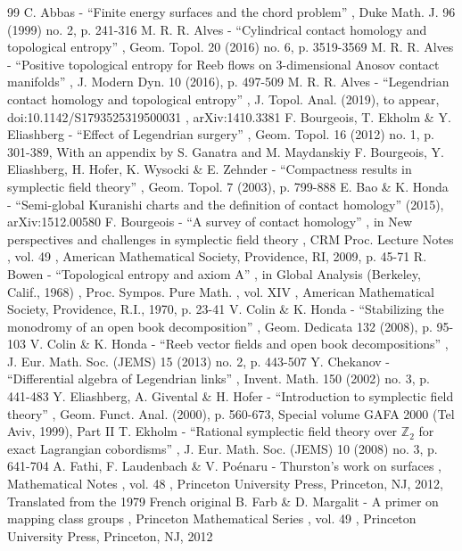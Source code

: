 \begin{thebibliography}{99}
 C. Abbas - “Finite energy surfaces and the chord problem” , Duke Math. J. 96 (1999) no. 2, p. 241-316
 M. R. R. Alves - “Cylindrical contact homology and topological entropy” , Geom. Topol. 20 (2016) no. 6, p. 3519-3569
 M. R. R. Alves - “Positive topological entropy for Reeb flows on 3-dimensional Anosov contact manifolds” , J. Modern Dyn. 10 (2016), p. 497-509
 M. R. R. Alves - “Legendrian contact homology and topological entropy” , J. Topol. Anal. (2019), to appear, doi:10.1142/S1793525319500031 , arXiv:1410.3381
 F. Bourgeois, T. Ekholm \& Y. Eliashberg - “Effect of Legendrian surgery” , Geom. Topol. 16 (2012) no. 1, p. 301-389, With an appendix by S. Ganatra and M. Maydanskiy
 F. Bourgeois, Y. Eliashberg, H. Hofer, K. Wysocki \& E. Zehnder - “Compactness results in symplectic field theory” , Geom. Topol. 7 (2003), p. 799-888
 E. Bao \& K. Honda - “Semi-global Kuranishi charts and the definition of contact homology” (2015), arXiv:1512.00580
 F. Bourgeois - “A survey of contact homology” , in New perspectives and challenges in symplectic field theory , CRM Proc. Lecture Notes , vol. 49 , American Mathematical Society, Providence, RI, 2009, p. 45-71
 R. Bowen - “Topological entropy and axiom A” , in Global Analysis (Berkeley, Calif., 1968) , Proc. Sympos. Pure Math. , vol. XIV , American Mathematical Society, Providence, R.I., 1970, p. 23-41
 V. Colin \& K. Honda - “Stabilizing the monodromy of an open book decomposition” , Geom. Dedicata 132 (2008), p. 95-103
 V. Colin \& K. Honda - “Reeb vector fields and open book decompositions” , J. Eur. Math. Soc. (JEMS) 15 (2013) no. 2, p. 443-507
 Y. Chekanov - “Differential algebra of Legendrian links” , Invent. Math. 150 (2002) no. 3, p. 441-483
 Y. Eliashberg, A. Givental \& H. Hofer - “Introduction to symplectic field theory” , Geom. Funct. Anal. (2000), p. 560-673, Special volume GAFA 2000 (Tel Aviv, 1999), Part II
 T. Ekholm - “Rational symplectic field theory over $\mathbb{Z}_2$ for exact Lagrangian cobordisms” , J. Eur. Math. Soc. (JEMS) 10 (2008) no. 3, p. 641-704
 A. Fathi, F. Laudenbach \& V. Poénaru - Thurston’s work on surfaces , Mathematical Notes , vol. 48 , Princeton University Press, Princeton, NJ, 2012, Translated from the 1979 French original
 B. Farb \& D. Margalit - A primer on mapping class groups , Princeton Mathematical Series , vol. 49 , Princeton University Press, Princeton, NJ, 2012

\end{thebibliography}
